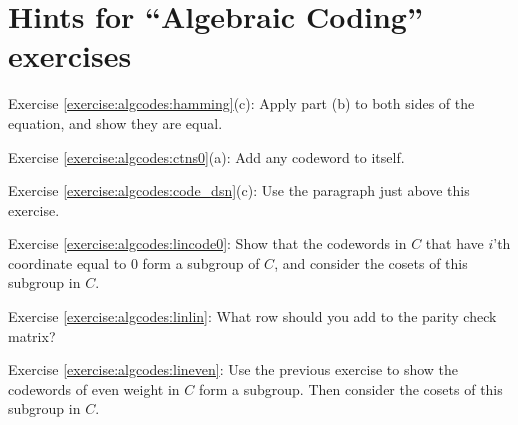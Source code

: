 \section{Hints for ``Algebraic Coding'' exercises}\label{sec:algcodes:hints} 


Exercise \ref{exercise:algcodes:hamming}(c): Apply part (b) to both sides of the equation, and show they are equal.


\noindent Exercise \ref{exercise:algcodes:ctns0}(a): Add any codeword to itself.

\noindent Exercise \ref{exercise:algcodes:code_dsn}(c): Use the  paragraph just above this exercise.

\noindent Exercise \ref{exercise:algcodes:lincode0}: Show that the codewords in $C$ that have $i$'th coordinate equal to 0 form a subgroup of $C$, and consider the cosets of this subgroup in $C$.

\noindent Exercise \ref{exercise:algcodes:linlin}:  What row should you add to the parity check matrix?

\noindent Exercise \ref{exercise:algcodes:lineven}:  Use the previous exercise to show the codewords of even weight in $C$ form a subgroup. Then consider the cosets of this subgroup in $C$.

